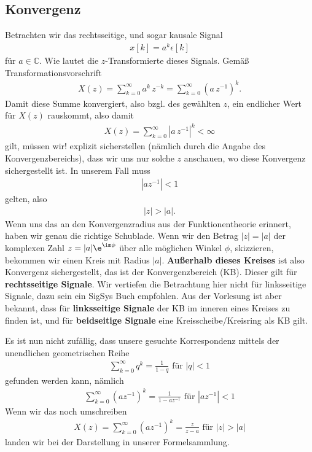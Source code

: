 \subsection*{Konvergenz}
Betrachten wir das rechtsseitige, und sogar kausale Signal
\begin{align}
x[k] = a^k \epsilon[k]
\end{align}
für $a\in\mathbb{C}$.
%
Wie lautet die $z$-Transformierte dieses Signals. Gemäß Transformationsvorschrift
\begin{align}
X(z) = \sum_{k=0}^{\infty} a^k \, z^{-k} = \sum_{k=0}^{\infty} (a \, z^{-1})^k.
\end{align}
Damit diese Summe konvergiert, also bzgl. des gewählten $z$, ein endlicher Wert
für $X(z)$ rauskommt, also damit
\begin{align}
X(z) = \sum_{k=0}^{\infty} |a \, z^{-1}|^k < \infty
\end{align}
gilt, müssen wir! explizit sicherstellen (nämlich durch die Angabe des
Konvergenzbereichs), dass wir uns nur solche $z$ anschauen, wo diese Konvergenz
sichergestellt ist. In unserem Fall muss
\begin{align}
|a z^{-1}| < 1
\end{align}
gelten, also
\begin{align}
|z| > |a|.
\end{align}
%
Wenn uns das an den Konvergenzradius aus der Funktionentheorie erinnert,
haben wir genau die richtige Schublade.
%
Wenn wir den Betrag $|z|=|a|$
der komplexen Zahl $z = |a| \e^{\im\phi}$ über alle möglichen Winkel $\phi$,
skizzieren, bekommen wir einen Kreis mit Radius $|a|$.
\textbf{Außerhalb dieses Kreises}
ist also Konvergenz sichergestellt, das ist der Konvergenzbereich (KB).
Dieser gilt für \textbf{rechtsseitige Signale}. Wir vertiefen die Betrachtung
hier nicht für linksseitige Signale, dazu sein ein SigSys Buch empfohlen.
%
Aus der Vorlesung ist aber bekannt, dass für \textbf{linksseitige Signale}
der KB im inneren eines Kreises zu finden ist, und für \textbf{beidseitige Signale}
eine Kreisscheibe/Kreisring als KB gilt.

Es ist nun nicht zufällig, dass unsere gesuchte
Korrespondenz mittels der unendlichen geometrischen Reihe
\begin{align}
\sum_{k=0}^\infty q^k = \frac{1}{1-q}\text{ für }|q|<1
\end{align}
gefunden werden kann, nämlich
\begin{align}
\sum_{k=0}^\infty (a z^{-1})^k = \frac{1}{1-a z^{-1}}\text{ für }|a z^{-1}|<1
\end{align}
Wenn wir das noch umschreiben
\begin{align}
X(z) = \sum_{k=0}^\infty (a z^{-1})^k = \frac{z}{z-a}\text{ für } |z|>|a|
\end{align}
landen wir bei der Darstellung in unserer Formelsammlung.
%

